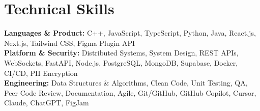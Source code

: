 \documentclass[letterpaper,11pt]{article}
\begin{document}
\section{Technical Skills}
\begin{itemize}[leftmargin=0.15in, label={}]
  \small{\item{
    \textbf{Languages \& Product:} C++, JavaScript, TypeScript, Python, Java, React.js, Next.js, Tailwind CSS, Figma Plugin API \\
    \textbf{Platform \& Security:} Distributed Systems, System Design, REST APIs, WebSockets, FastAPI, Node.js, PostgreSQL, MongoDB, Supabase, Docker, CI/CD, PII Encryption \\
    \textbf{Engineering:} Data Structures \& Algorithms, Clean Code, Unit Testing, QA, Peer Code Review, Documentation, Agile, Git/GitHub, GitHub Copilot, Cursor, Claude, ChatGPT, FigJam
  }}
\end{itemize}
\end{document}
